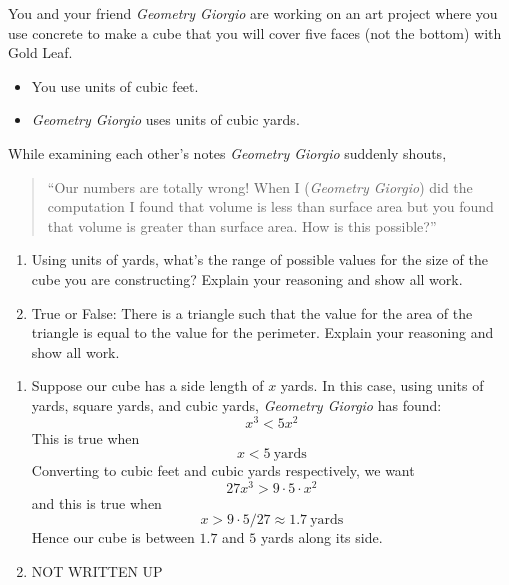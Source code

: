 \documentclass[handout,nooutcomes,noauthor]{ximera}
\begin{document}
\begin{question}
  You and your friend \textit{Geometry Giorgio} are working on an art
  project where you use concrete to make a cube that you will cover
  five faces (not the bottom) with Gold Leaf.
  \begin{itemize}
  \item You use units of cubic feet.
  \item \textit{Geometry Giorgio} uses units of cubic yards.
  \end{itemize}
  While examining each other's notes \textit{Geometry Giorgio}
  suddenly shouts,
  \begin{quote}
    ``Our numbers are totally wrong! When I (\textit{Geometry Giorgio})
    did the computation I found that volume is less than surface area
    but you found that volume is greater than surface area.  How is
    this possible?''
  \end{quote}
  \begin{enumerate}
  \item Using units of yards, what's the range of possible values
    for the size of the cube you are constructing? Explain your
    reasoning and show all work.
  \item True or False: There is a triangle such that the value for the
    area of the triangle is equal to the value for the
    perimeter. Explain your reasoning and show all work.
  \end{enumerate}
  \begin{freeResponse}
    \begin{enumerate}
    \item Suppose our cube has a side length of $x$ yards. In this
      case, using units of yards, square yards, and cubic yards,
      \textit{Geometry Giorgio} has found:
      \[
      x^3 < 5x^2
      \]
      This is true when
      \[
      x<5~\text{yards}
      \]
      Converting to cubic feet and cubic yards respectively, we want
      \[
      27x^3 > 9\cdot 5\cdot x^2
      \]
      and this is true when
      \[
      x > 9\cdot 5/27 \approx 1.7~\text{yards}
      \]
      Hence our cube is between $1.7$ and $5$ yards along its side.
    \item NOT WRITTEN UP
    \end{enumerate}
  \end{freeResponse}
\end{question}
\end{document}
